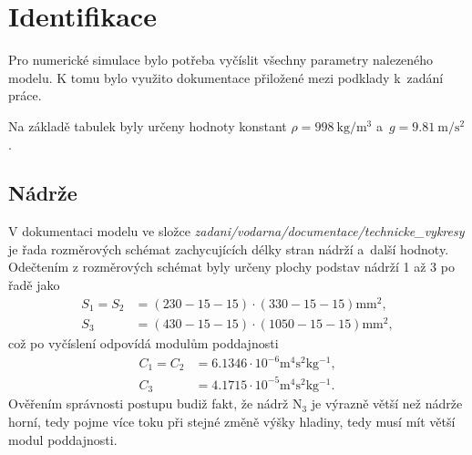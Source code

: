 \documentclass[conference]{IEEEtran}
\begin{document}
\section{Identifikace}

Pro numerické simulace bylo potřeba vyčíslit všechny parametry nalezeného modelu.
K tomu bylo využito dokumentace přiložené mezi podklady k~zadání práce.

Na základě tabulek \cite{tabulky} byly určeny hodnoty konstant $\rho = 998~\si{\kilogram\per\metre\cubed}$ a~$g=9.81~\si{\metre\per\second\squared}$.

\subsection{Nádrže}
V dokumentaci modelu ve složce \textit{zadani/vodarna/documentace/technicke\_vykresy}
je řada rozměrových schémat zachycujících délky stran nádrží a~další hodnoty. Odečtením z rozměrových schémat
byly určeny plochy podstav nádrží 1 až 3 po řadě jako
\begin{equation}
    \begin{split}
        S_1 = S_2 &= (230-15-15)\cdot(330-15-15) \si{\milli\metre\squared}, \\
        S_3 &= (430-15-15)\cdot(1050-15-15) \si{\milli\metre\squared},
    \end{split}
\end{equation}
což po vyčíslení odpovídá modulům poddajnosti
\begin{equation}
    \begin{split}        
        C_1 = C_2 &= 6.1346 \cdot 10^{-6} \si{\metre^4 \second^2\kg^{-1}}, \\
        C_3 &= 4.1715 \cdot 10^{-5}\si{\metre^4 \second^2\kg^{-1}}.
    \end{split}
\end{equation}
Ověřením správnosti postupu budiž fakt, že nádrž $\text{N}_3$ je výrazně větší než nádrže horní,
tedy pojme více toku při stejné změně výšky hladiny, tedy musí mít větší modul poddajnosti.
\end{document}
